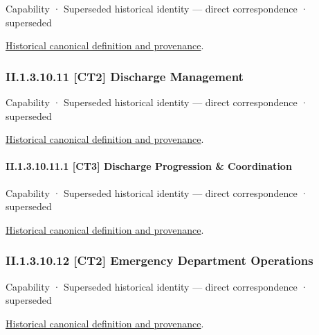 \label{element:0115ed50867d468a95c0fafa1c5d79e2}
{\small Capability · Superseded historical identity — direct correspondence · superseded}\par
\href{../../../../continuum/strategy/capability/0115ed50867d468a95c0fafa1c5d79e2.md}{Historical canonical definition and provenance}.\par
\subsubsection*{II.1.3.10.11 [CT2] Discharge Management}
\label{navigation:II.1.3.10.11}

\label{element:c57c0721ab0040ccb24e88e5e92e8cf8}
{\small Capability · Superseded historical identity — direct correspondence · superseded}\par
\href{../../../../continuum/strategy/capability/c57c0721ab0040ccb24e88e5e92e8cf8.md}{Historical canonical definition and provenance}.\par
\paragraph*{II.1.3.10.11.1 [CT3] Discharge Progression \& Coordination}
\label{navigation:II.1.3.10.11.1}

\label{element:68344272ca6049648a3ddae20c150f37}
{\small Capability · Superseded historical identity — direct correspondence · superseded}\par
\href{../../../../continuum/strategy/capability/68344272ca6049648a3ddae20c150f37.md}{Historical canonical definition and provenance}.\par
\subsubsection*{II.1.3.10.12 [CT2] Emergency Department Operations}
\label{navigation:II.1.3.10.12}

\label{element:8963b571e9cc40e49c5d738e31d2f97e}
{\small Capability · Superseded historical identity — direct correspondence · superseded}\par
\href{../../../../continuum/strategy/capability/8963b571e9cc40e49c5d738e31d2f97e.md}{Historical canonical definition and provenance}.\par
